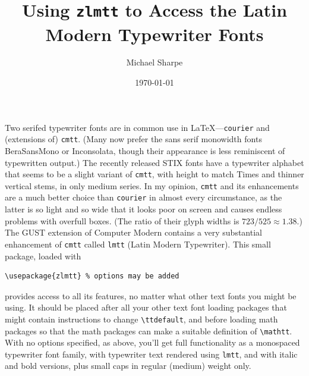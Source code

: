 \documentclass[11pt]{article}
\title{Using {\tt zlmtt} to Access the Latin Modern Typewriter Fonts}
\author{Michael Sharpe}
\date{\today}  %
\begin{document}
\maketitle
Two serifed typewriter fonts are in common use in \LaTeX---{\tt courier} and (extensions of) {\tt cmtt}. (Many now prefer the sans serif monowidth fonts BeraSansMono or Inconsolata, though their appearance is less reminiscent of typewritten output.) The recently released STIX fonts have a typewriter alphabet that seems to be a slight variant of {\tt cmtt}, with height to match Times and thinner vertical stems, in only medium series. In my opinion, {\tt cmtt} and its enhancements are a much better choice than {\tt courier} in almost every circumstance, as the latter is so light and so wide that it looks poor on screen and causes endless problems with overfull boxes. (The ratio of their glyph widths is $723/525\approx1.38$.) The GUST extension of Computer Modern contains a very substantial enhancement of {\tt cmtt} called {\tt lmtt} (Latin Modern Typewriter). This small package, loaded with
\begin{verbatim}
\usepackage{zlmtt} % options may be added
\end{verbatim}
provides access to all its features, no matter what other text fonts you might be using. It should be placed after all your other text font loading packages that might contain instructions to change \verb|\ttdefault|, and before loading math packages so that the math packages can make a suitable definition of \verb|\mathtt|. With no options specified, as above, you'll get full functionality as a monospaced typewriter font family, with typewriter text rendered using {\tt lmtt}, and with italic and bold versions, plus small caps in regular (medium) weight only. 
\end{document}
